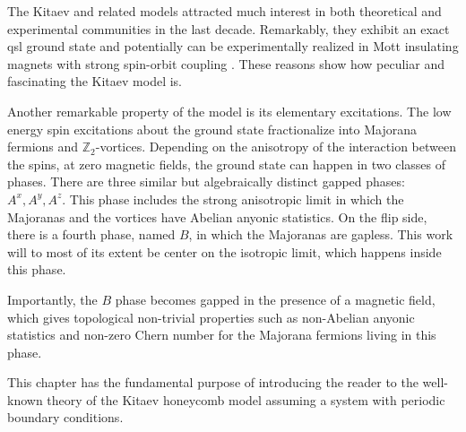 \label{ch:2}
The Kitaev and related models attracted much interest in both theoretical and experimental communities in the last decade. Remarkably, they exhibit an exact \acrshort{qsl} ground state and potentially can be experimentally realized in Mott insulating magnets with strong spin-orbit coupling \cite{Jackeli_2009, trebst2017kitaev, takagi2019}. These reasons show how peculiar and fascinating the Kitaev model is.

Another remarkable property of the model is its elementary excitations. The low energy spin excitations about the ground state fractionalize into Majorana fermions and $\mathbb{Z}_2$-vortices. Depending on the anisotropy of the interaction between the spins, at zero magnetic fields, the ground state can happen in two classes of phases. There are three similar but algebraically distinct gapped phases: $A^x,A^y,A^z$. This phase includes the strong anisotropic limit in which the Majoranas and the vortices have Abelian anyonic statistics. On the flip side, there is a fourth phase, named $B$, in which the Majoranas are gapless. This work will to most of its extent be center on the isotropic limit, which happens inside this phase.

Importantly, the $B$ phase becomes gapped in the presence of a magnetic field, which gives topological non-trivial properties such as non-Abelian anyonic statistics and non-zero Chern number for the Majorana fermions living in this phase.

This chapter has the fundamental purpose of introducing the reader to the well-known theory \cite{Kitaev_2006} of the Kitaev honeycomb model assuming a system with periodic boundary conditions. 

\begin{comment}
\textcolor{red!40!black}{
 The chapter will be divided as follow:
\begin{itemize}
    \item shortly describing the model without magnetic field   (basically chapters $1$,$2$ and $4$ of the article ): describe the lattice, the Hamiltonian, the transformation to Majorana, bond variable, flux sectors, a solution with Fourier transform, the phase diagram and the \textbf{dispersion}; 
    \item with magnetic field in perturbation theory (chapter $6$ of the article );
    \item about the elementary excitation (chapters $7$ and $8$).
\end{itemize}
The purpose of the chapter is to tell the relevant aspects of the model. I will not prove anything.
}
(HERE DESCRIBE THE LATTICE: HONEYCOMB, EVEN-ODD, PICTURE)
\end{comment}




